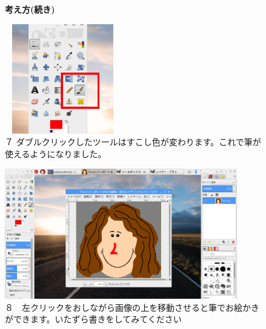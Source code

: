 \documentclass[a4paper,12pt]{jarticle}
\begin{document}
\begin{figure}[ht]
  \textbf{考え方(続き)}

  \begin{minipage}{\textwidth}
    \centering
    \begin{minipage}{5.76cm}
      \includegraphics[width=5.05cm,height=4.796cm]{textbook-img130.png}\\
      ７
      ダブルクリックしたツールはすこし色が変わります。これで筆が使えるようになりました。
    \end{minipage}
    \hfill
    \begin{minipage}{10.2cm}
      \includegraphics[width=10.134cm,height=5.697cm]{textbook-img131.png}\\
      ８　左クリックをおしながら画像の上を移動させると筆でお絵かきができます。いたずら書きをしてみてください
    \end{minipage}
  \end{minipage}


  \bigskip


\end{figure}
\end{document}
